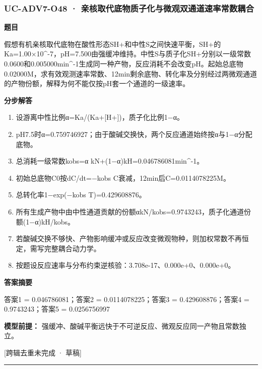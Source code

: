 \documentclass[UTF8,11pt,a4paper]{ctexart}
\begin{document}
\subsubsection*{UC-ADV7-O48 · 亲核取代底物质子化与微观双通道速率常数耦合}
\noindent\textbf{题目}\par
假想有机亲核取代底物在酸性形态SH+和中性S之间快速平衡，SH+的Ka=1.00×10\textasciicircum{}-7，pH=7.500由强缓冲维持。中性S与质子化SH+分别以一级常数0.0600和0.005000min\textasciicircum{}-1生成同一种产物，反应消耗不会改变pH。起始总底物0.02000M，求有效观测速率常数、12min剩余底物、转化率及分别经过两微观通道的产物份额，解释为何不能仅按pH套一个通道的一级速率。\par
\medskip\noindent\textbf{分步解答}
\begin{enumerate}
\item 设游离中性比例α=Ka/(Ka+[H+])，质子化比例1−α。
\item pH7.5时α=0.759746927；由于酸碱交换快，两个反应通道始终按α与1−α分配底物。
\item 总消耗一级常数kobs=α kN+(1−α)kH=0.046786081min\textasciicircum{}-1。
\item 初始总底物C0按dC/dt=−kobs C衰减，12min后C=0.0114078225M。
\item 总转化率1−exp(−kobs T)=0.429608876。
\item 所有生成产物中由中性通道贡献的份额αkN/kobs=0.9743243，质子化通道份额(1−α)kH/kobs。
\item 若酸碱交换不够快、产物影响缓冲或反应改变微观物种，则加权常数不再恒定，需写完整耦合动力学。
\item 按题设反应速率与分布约束逆核验：3.708e-17、0.000e+0、0.000e+0。
\end{enumerate}
\noindent\textbf{答案摘要}\par
答案1 = 0.046786081；答案2 = 0.0114078225；答案3 = 0.429608876；答案4 = 0.9743243；答案5 = 0.0256756997\par
\noindent\textbf{模型前提：}
强缓冲、酸碱平衡远快于不可逆反应、微观反应同一产物且常数独立。\par
\noindent\textcolor{red!65!black}{[跨辑去重未完成 · 草稿]} \par
\medskip\hrule\medskip
{}
\end{document}
